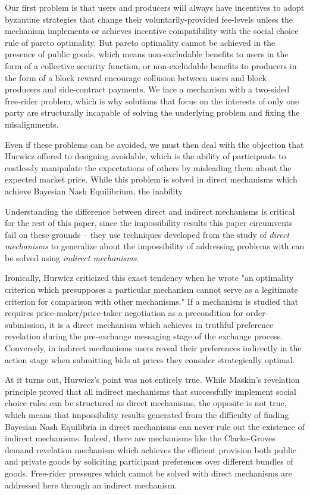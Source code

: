 \documentclass[sigconf,anonymous]{aamas}
\begin{document}
Our first problem is that users and producers will always have incentives to adopt byzantine strategies that change their voluntarily-provided fee-levels unless the mechanism implements or achieves incentive compatibility with the social choice rule of pareto optimality. But pareto optimality cannot be achieved in the presence of public goods, which means non-excludable benefits to users in the form of a collective security function, or non-excludable benefits to producers in the form of a block reward encourage collusion between users and block producers and side-contract payments. We face a mechanism with a two-sided free-rider problem, which is why solutions that focus on the interests of only one party are structurally incapable of solving the underlying problem and fixing the misalignments.

Even if these problems can be avoided, we must then deal with the objection that Hurwicz offered to designing avoidable, which is the ability of participants to costlessly manipulate the expectations of others by misleading them about the expected market price. While this problem is solved in direct mechanisms which achieve Bayesian Nash Equilibrium, the inability 







Understanding the difference between direct and indirect mechanisms is critical for the rest of this paper, since the impossibility results this paper circumvents fail on these grounds -- they use techniques developed from the study of \textit{direct mechanisms} to generalize about the impossibility of addressing problems with can be solved using \textit{indirect mechanisms}.

Ironically, Hurwicz criticized this exact tendency when he wrote "an optimality criterion which presupposes a particular mechanism cannot serve as a legitimate criterion for comparison with other mechanisms." If a mechanism is studied that requires price-maker/price-taker negotiation as a precondition for order-submission, it is a direct mechanism which achieves in truthful preference revelation during the pre-exchange messaging stage of the exchange process. Conversely, in indirect mechanisms users reveal their preferences indirectly in the action stage when submitting bids at prices they consider strategically optimal.

At it turns out, Hurwicz's point was not entirely true. While Maskin's revelation principle proved that all indirect mechanisms that successfully implement social choice rules can be structured as direct mechanisms, the opposite is not true, which means that impossibility results generated from the difficulty of finding Bayesian Nash Equilibria in direct mechanisms can never rule out the existence of indirect mechanisms. Indeed, there are mechanisms like the Clarke-Groves demand revelation mechanism which achieves the efficient provision both public and private goods by soliciting participant preferences over different bundles of goods. Free-rider pressures which cannot be solved with direct mechanisms are addressed here through an indirect mechanism.
\end{document}
